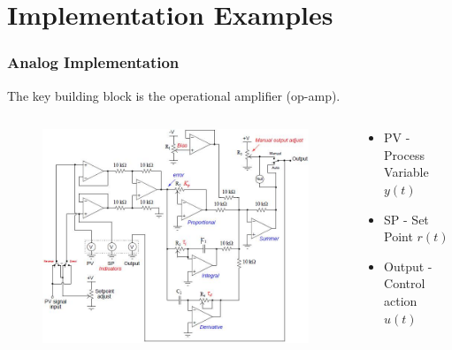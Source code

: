 \section{Implementation Examples}

\begin{frame}
	\frametitle{Analog Implementation}
	The key building block is the operational amplifier (op-amp).
	\begin{columns}
		\begin{column}{0.7 \textwidth}
			\begin{figure}
				\includegraphics[width=1\linewidth]{img/Principles_of_Feedback_Control_Fig_079}
			\end{figure}
		\end{column}
		\begin{column}{0.3 \textwidth}
			\footnotesize{
				\begin{itemize}
					\item PV - Process Variable $y(t)$
					\item SP - Set Point $r(t)$
					\item Output - Control action $u(t)$
				\end{itemize}
			}
		\end{column}
	\end{columns}
\end{frame}

